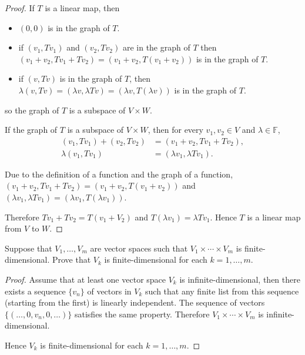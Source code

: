 \begin{proof}
    If $T$ is a linear map, then
    \begin{itemize}
        \item $(0,0)$ is in the graph of $T$.
        \item if $(v_{1}, Tv_{1})$ and $(v_{2}, Tv_{2})$ are in the graph of $T$ then $(v_{1} + v_{2}, Tv_{1} + Tv_{2}) = (v_{1} + v_{2}, T(v_{1} + v_{2}))$ is in the graph of $T$.
        \item if $(v, Tv)$ is in the graph of $T$, then $\lambda (v, Tv) = (\lambda v, \lambda Tv) = (\lambda v, T(\lambda v))$ is in the graph of $T$.
    \end{itemize}

    so the graph of $T$ is a subspace of $V\times W$.

    If the graph of $T$ is a subspace of $V\times W$, then for every $v_{1}, v_{2}\in V$ and $\lambda\in\mathbb{F}$,
    \begin{align*}
        (v_{1}, Tv_{1}) + (v_{2}, Tv_{2}) & = (v_{1}+v_{2}, Tv_{1} + Tv_{2}),  \\
        \lambda (v_{1}, Tv_{1})           & = (\lambda v_{1}, \lambda Tv_{1}).
    \end{align*}

    Due to the definition of a function and the graph of a function, $(v_{1}+v_{2}, Tv_{1} + Tv_{2}) = (v_{1} + v_{2}, T(v_{1} + v_{2}))$ and $(\lambda v_{1}, \lambda Tv_{1}) = (\lambda v_{1}, T(\lambda v_{1}))$.

    Therefore $Tv_{1} + Tv_{2} = T(v_{1} + V_{2})$ and $T(\lambda v_{1}) = \lambda Tv_{1}$. Hence $T$ is a linear map from $V$ to $W$.
\end{proof}
\newpage

\begin{exercise}
    Suppose that $V_{1} , \ldots, V_{m}$ are vector spaces such that $V_{1} \times \cdots \times V_{m}$ is finite-dimensional. Prove that $V_{k}$ is finite-dimensional for each $k = 1, \ldots, m$.
\end{exercise}

\begin{proof}
    Assume that at least one vector space $V_{k}$ is infinite-dimensional, then there exists a sequence $\{ v_{n} \}$ of vectors in $V_{k}$ such that any finite list from this sequence (starting from the first) is linearly independent. The sequence of vectors $\{ (\ldots, 0, v_{n}, 0, \ldots) \}$ satisfies the same property. Therefore $V_{1}\times \cdots \times V_{m}$ is infinite-dimensional.

    Hence $V_{k}$ is finite-dimensional for each $k = 1,\ldots, m$.
\end{proof}
\newpage

